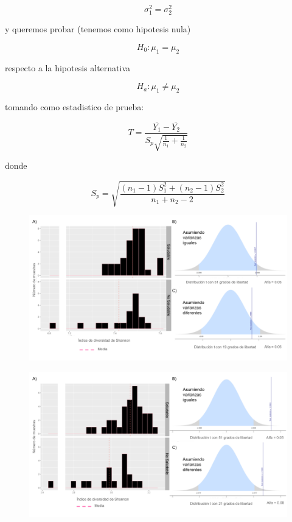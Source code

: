 $$\sigma_{1}^{2} = \sigma_{2}^{2}$$

y queremos probar (tenemos como hipotesis nula)

$$H_{0} : \mu_{1} = \mu _{2}$$

respecto a la hipotesis alternativa

$$H_{a} : \mu_{1} \neq \mu _{2}$$

tomando como estadistico de prueba:

$$ T = \frac{\bar{Y_{1}} - \bar{Y_{2}}}{S_{p}\sqrt{\frac{1}{n_{1}} + \frac{1}{n_{2}}}}$$

donde  

$$ S_{p} = \sqrt{\frac{(n_{1}-1)S_{1}^{2} + (n_{2}-1)S_{2}^{2}}{n_{1} + n_{2} - 2}}$$

\begin{figure}[!]
\centering
\includegraphics[width=\textwidth]{Img/cap2/tTest_Shannon.png}
\caption{}
\end{figure}


\begin{figure}[!]
\centering
\includegraphics[width=\textwidth]{Img/cap2/tTest_Shannon_Fusarium.png}
\caption{}
\end{figure}


